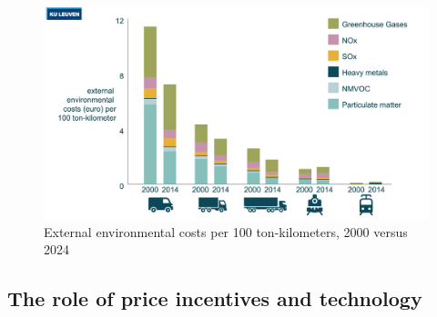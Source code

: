 \documentclass[../summary.tex]{subfiles}
\begin{document}
	\begin{figure}[htbp]
		\centering
		\includegraphics[width=1\linewidth]{images/9-external-environmental-cost.png}
		\caption{External environmental costs per 100 ton-kilometers, 2000 versus 2024}
		\label{fig:external-environmental-costs}
	\end{figure}
	
	\subsection{The role of price incentives and technology}
	
\end{document}
